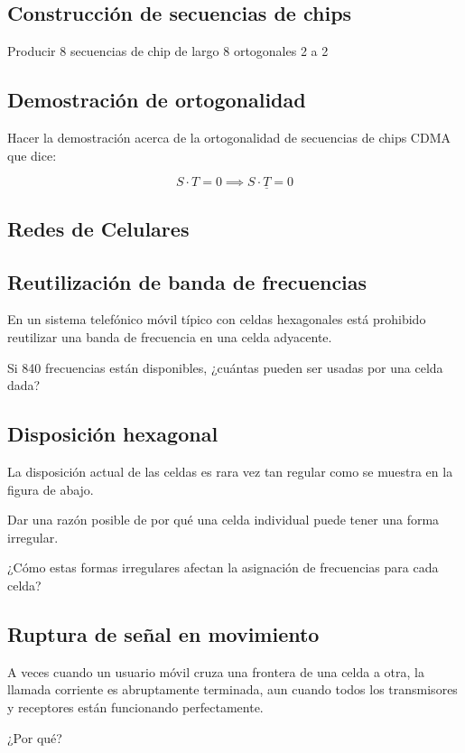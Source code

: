 \documentclass[12pt]{report}
\begin{document}
\begin{exer}
	\subsection{Construcción de secuencias de chips \stwo}
	Producir 8 secuencias de chip de largo 8 ortogonales 2 a 2
\end{exer}

\begin{exer}
	\subsection{Demostración de ortogonalidad \sone \steo \shard}
	Hacer la demostración acerca de la ortogonalidad de secuencias de chips CDMA que dice:

	$$ S \cdot T = 0 \implies S \cdot \underline{T} = 0 $$
\end{exer}

\begin{exer}
	\section{Redes de Celulares}
	\subsection{Reutilización de banda de frecuencias \sthree}
	En un sistema telefónico móvil típico con celdas hexagonales está prohibido reutilizar una banda de frecuencia en una celda adyacente.

	Si 840 frecuencias están disponibles, ¿cuántas pueden ser usadas por una celda dada?
\end{exer}

\begin{exer}
	\subsection{Disposición hexagonal \stwo \steo}
	La disposición actual de las celdas es rara vez tan regular como se muestra en la figura de abajo.


	Dar una razón posible de por qué una celda individual puede tener una forma irregular.

	¿Cómo estas formas irregulares afectan la asignación de frecuencias para cada celda?
\end{exer}

\begin{exer}
	\subsection{Ruptura de señal en movimiento \sone \steo}
	A veces cuando un usuario móvil cruza una frontera de una celda a otra, la llamada
	corriente es abruptamente terminada, aun cuando todos los transmisores y receptores están
	funcionando perfectamente.

	¿Por qué?
\end{exer}
\end{document}
